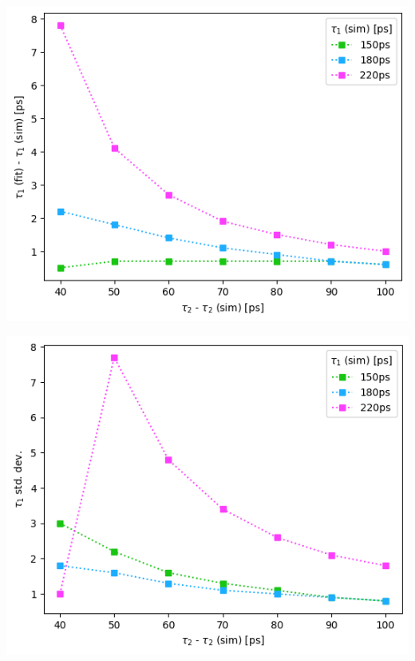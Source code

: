 \begin{minipage}{.47\linewidth}
    \centering
    \includegraphics[width=\linewidth]{Batch 3/regular IRF/t1-diff 8020.png}
    \label{fig:comp-t1-8020}
\end{minipage}
\hfill
\begin{minipage}{.47\linewidth}
    \centering
    \includegraphics[width=\linewidth]{Batch 3/regular IRF/t1-err 8020.png}
    \label{fig:comp-t1err-8020}
\end{minipage}

\vfill
